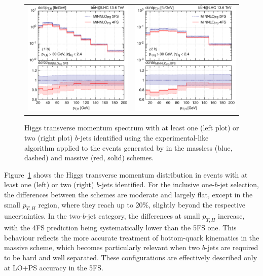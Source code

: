 \documentclass[11pt,a4paper]{article}
\begin{document}
\begin{figure}[t!]
\begin{center}
\begin{tabular}{cc}
\includegraphics[width=.45\textwidth, page=1]{plots/4fs/pt_H-EXP-1bjet.pdf}&
\includegraphics[width=.45\textwidth, page=1]{plots/4fs/pt_H-EXP-2bjet.pdf}
\end{tabular}
\vspace*{1ex}
\caption{Higgs transverse momentum spectrum with at least one (left plot) or two (right plot) $b$-jets identified using the experimental-like algorithm applied to the events generated by \minnlo{} in the massless (blue, dashed) and massive (red, solid) schemes.\label{fig:4fsB}}
\end{center}
\end{figure}
 
Figure~\ref{fig:4fsB} shows the Higgs transverse momentum distribution in events with at least one (left) or two (right) $b$-jets identified. For the inclusive one-$b$-jet selection, the differences between the schemes are moderate and largely flat, except in the small $p_{T,H}$ region, where they reach up to 20\%, slightly beyond the respective uncertainties. 
In the two-$b$-jet category, the differences at small $p_{T,H}$ increase, with the 4FS prediction being systematically lower than the 5FS one. This behaviour reflects the more accurate treatment of bottom-quark kinematics in the massive scheme, which becomes particularly relevant when two $b$-jets are required to be hard and well separated. These configurations
are effectively described only at LO+PS accuracy in the 5FS.
\end{document}
